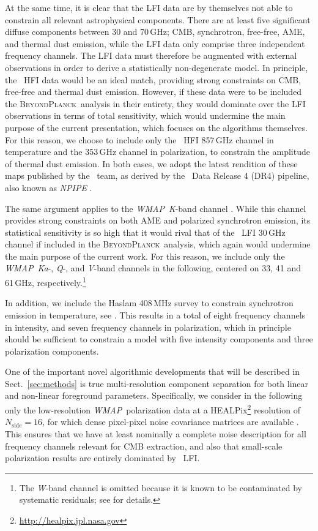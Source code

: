 \documentclass[twocolumn]{aa}
\def\WMAP{\textit{WMAP}}
\newcommand{\BP}{\textsc{BeyondPlanck}}
\newcommand{\?}[1]{\textcolor{red}{{\bf [#1]}}}
\begin{document}
At the same time, it is clear that the LFI data are by themselves not able to
constrain all relevant astrophysical components. There are at least five
significant diffuse components between 30 and 70\,GHz; CMB, synchrotron,
free-free, AME, and thermal dust emission, while the LFI data only comprise
three independent frequency channels. The LFI data must therefore be augmented
with external observations in order to derive a statistically non-degenerate
model. In principle, the \Planck\ HFI data \citep{planck2016-l03} would be an
ideal match, providing strong constraints on CMB, free-free and thermal dust
emission. However, if these data were to be included the \BP\ analysis in their
entirety, they would dominate over the LFI observations in terms of total
sensitivity, which  would undermine the main purpose of the current
presentation, which focuses on the algorithms themselves. For this reason, we
choose to include only the \Planck\ HFI 857\,GHz channel in temperature and the
353\,GHz channel in polarization, to constrain the amplitude of thermal dust
emission. In both cases, we adopt the latest rendition of these maps published
by the \Planck\ team, as derived by the \Planck\ Data Release 4 (DR4) pipeline,
also known as \textit{NPIPE} \citep{planck2020-LVII}.

The same argument applies to the \WMAP\ \textit K-band channel
\citep{bennett2012}. While this channel provides strong constraints on both AME
and polarized synchrotron emission, its statistical sensitivity is so high that
it would rival that of the \Planck\ LFI 30\,GHz channel if included in the \BP\
analysis, which again would undermine the main purpose of the current work. For
this reason, we include only the \WMAP\ \textit{Ka}-, \textit Q-, and \textit
V-band channels in the following, centered on 33, 41 and 61\,GHz, respectively.\footnote{The \textit W-band channel is omitted because it is known to be contaminated by
systematic residuals; see \citet{bennett2012,bp17} for details.}

In addition, we include the Haslam 408\,MHz survey to constrain synchrotron
emission in temperature, see \citet{bp13}. This results in a total of eight frequency channels in
intensity, and seven frequency channels in polarization, which in
principle should be sufficient to constrain a model with five intensity
components and three polarization components.

One of the important novel algorithmic developments that will be described in
Sect.~\ref{sec:methods} is true multi-resolution component separation for both
linear and non-linear foreground parameters. Specifically, we consider in the
following only the low-resolution \WMAP\ polarization data at a
HEALPix\footnote{\url{http://healpix.jpl.nasa.gov}} \citep{gorski2005}
resolution of $N_{\mathrm{side}}=16$, for which dense pixel-pixel noise
covariance matrices are available \citep{bennett2012}. This ensures that we have
at least nominally a complete noise description for all frequency channels
relevant for CMB extraction, and also that small-scale polarization results are
entirely dominated by \Planck\ LFI.
\end{document}
